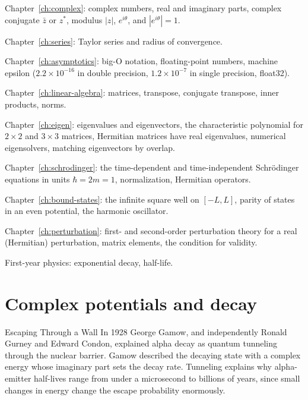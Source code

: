 \begin{prerequisites}
\item Chapter~\ref{ch:complex}: complex numbers, real and imaginary parts, complex conjugate $\bar z$ or $z^*$, modulus $|z|$, $e^{i\theta}$, and $|e^{i\theta}|=1$.
\item Chapter~\ref{ch:series}: Taylor series and radius of convergence.
\item Chapter~\ref{ch:asymptotics}: big-O notation, floating-point numbers, machine epsilon ($2.2\times10^{-16}$ in double precision, $1.2\times10^{-7}$ in single precision, float32).
\item Chapter~\ref{ch:linear-algebra}: matrices, transpose, conjugate transpose, inner products, norms.
\item Chapter~\ref{ch:eigen}: eigenvalues and eigenvectors, the characteristic polynomial for $2\times2$ and $3\times3$ matrices, Hermitian matrices have real eigenvalues, numerical eigensolvers, matching eigenvectors by overlap.
\item Chapter~\ref{ch:schrodinger}: the time-dependent and time-independent Schr\"odinger equations in units $\hbar=2m=1$, normalization, Hermitian operators.
\item Chapter~\ref{ch:bound-states}: the infinite square well on $[-L,L]$, parity of states in an even potential, the harmonic oscillator.
\item Chapter~\ref{ch:perturbation}: first- and second-order perturbation theory for a real (Hermitian) perturbation, matrix elements, the condition for validity.
\item First-year physics: exponential decay, half-life.
\end{prerequisites}

\section{Complex potentials and decay}\label{sec:non-hermitian-decay}
\begin{didyouknow}{Escaping Through a Wall}
In 1928 George Gamow, and independently Ronald Gurney and Edward Condon, explained alpha decay as quantum tunneling through the nuclear barrier. Gamow described the decaying state with a complex energy whose imaginary part sets the decay rate. Tunneling explains why alpha-emitter half-lives range from under a microsecond to billions of years, since small changes in energy change the escape probability enormously.
\end{didyouknow}

